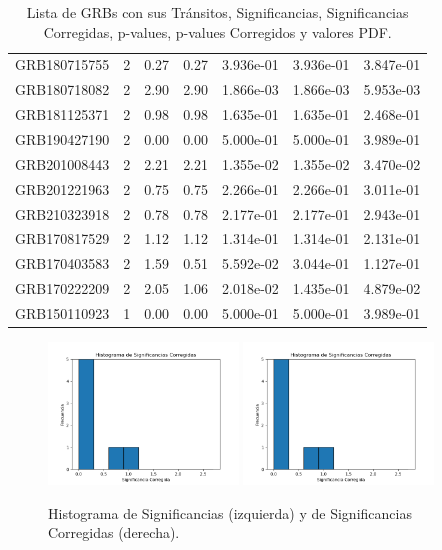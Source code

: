 \documentclass[12pt]{article}
\begin{document}
\begin{table}[h!]
{\begin{tabular}{l c c c c c c}
GRB180715755 & 2 & 0.27 & 0.27 & 3.936e-01 & 3.936e-01 & 3.847e-01 \\
GRB180718082 & 2 & 2.90 & 2.90 & 1.866e-03 & 1.866e-03 & 5.953e-03 \\
GRB181125371 & 2 & 0.98 & 0.98 & 1.635e-01 & 1.635e-01 & 2.468e-01 \\
GRB190427190 & 2 & 0.00 & 0.00 & 5.000e-01 & 5.000e-01 & 3.989e-01 \\
GRB201008443 & 2 & 2.21 & 2.21 & 1.355e-02 & 1.355e-02 & 3.470e-02 \\
GRB201221963 & 2 & 0.75 & 0.75 & 2.266e-01 & 2.266e-01 & 3.011e-01 \\
GRB210323918 & 2 & 0.78 & 0.78 & 2.177e-01 & 2.177e-01 & 2.943e-01 \\
GRB170817529 & 2 & 1.12 & 1.12 & 1.314e-01 & 1.314e-01 & 2.131e-01 \\
GRB170403583 & 2 & 1.59 & 0.51 & 5.592e-02 & 3.044e-01 & 1.127e-01 \\
GRB170222209 & 2 & 2.05 & 1.06 & 2.018e-02 & 1.435e-01 & 4.879e-02 \\
GRB150110923 & 1 & 0.00 & 0.00 & 5.000e-01 & 5.000e-01 & 3.989e-01 \\
\bottomrule
\end{tabular}%
}
\caption{Lista de GRBs con sus Tránsitos, Significancias, Significancias Corregidas, p-values, p-values Corregidos y valores PDF.}
\end{table}


\begin{figure}[h!]
\centering
\includegraphics[width=0.45\textwidth]{2nd_Transitcorrected_significance_hist.png}
\hfill
\includegraphics[width=0.45\textwidth]{2nd_Transitcorrected_significance_hist.png}
\caption{Histograma de Significancias (izquierda) y de Significancias Corregidas (derecha).}
\end{figure}
\end{document}
